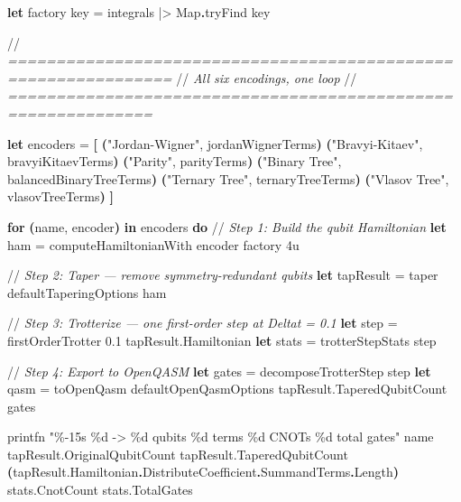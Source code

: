 \documentclass[
  11pt,
  oneside]{book}
\newenvironment{Shaded}{\begin{snugshade}}{\end{snugshade}}
\newcommand{\CommentTok}[1]{\textcolor[rgb]{0.56,0.35,0.01}{\textit{#1}}}
\newcommand{\DecValTok}[1]{\textcolor[rgb]{0.00,0.00,0.81}{#1}}
\newcommand{\FloatTok}[1]{\textcolor[rgb]{0.00,0.00,0.81}{#1}}
\newcommand{\KeywordTok}[1]{\textcolor[rgb]{0.13,0.29,0.53}{\textbf{#1}}}
\newcommand{\NormalTok}[1]{#1}
\newcommand{\OperatorTok}[1]{\textcolor[rgb]{0.81,0.36,0.00}{\textbf{#1}}}
\newcommand{\StringTok}[1]{\textcolor[rgb]{0.31,0.60,0.02}{#1}}
\begin{document}
\begin{Shaded}
\begin{Highlighting}[]
\KeywordTok{let}\NormalTok{ factory key = integrals |\textgreater{} Map}\KeywordTok{.}\NormalTok{tryFind key}

\NormalTok{//}\CommentTok{ ===============================================================}
\NormalTok{//}\CommentTok{  All six encodings, one loop}
\NormalTok{//}\CommentTok{ =============================================================}

\KeywordTok{let}\NormalTok{ encoders = }\OperatorTok{[}
    \OperatorTok{(}\StringTok{"Jordan{-}Wigner"}\NormalTok{,  jordanWignerTerms}\OperatorTok{)}
    \OperatorTok{(}\StringTok{"Bravyi{-}Kitaev"}\NormalTok{,  bravyiKitaevTerms}\OperatorTok{)}
    \OperatorTok{(}\StringTok{"Parity"}\NormalTok{,         parityTerms}\OperatorTok{)}
    \OperatorTok{(}\StringTok{"Binary Tree"}\NormalTok{,    balancedBinaryTreeTerms}\OperatorTok{)}
    \OperatorTok{(}\StringTok{"Ternary Tree"}\NormalTok{,   ternaryTreeTerms}\OperatorTok{)}
    \OperatorTok{(}\StringTok{"Vlasov Tree"}\NormalTok{,    vlasovTreeTerms}\OperatorTok{)}
\OperatorTok{]}

\KeywordTok{for} \OperatorTok{(}\NormalTok{name, encoder}\OperatorTok{)} \KeywordTok{in}\NormalTok{ encoders }\KeywordTok{do}
\NormalTok{    //}\CommentTok{ Step 1: Build the qubit Hamiltonian}
    \KeywordTok{let}\NormalTok{ ham = computeHamiltonianWith encoder factory }\DecValTok{4}\NormalTok{u}

\NormalTok{    //}\CommentTok{ Step 2: Taper --- remove symmetry{-}redundant qubits}
    \KeywordTok{let}\NormalTok{ tapResult = taper defaultTaperingOptions ham}

\NormalTok{    //}\CommentTok{ Step 3: Trotterize --- one first{-}order step at Deltat = 0.1}
    \KeywordTok{let}\NormalTok{ step = firstOrderTrotter }\FloatTok{0.1}\NormalTok{ tapResult.Hamiltonian}
    \KeywordTok{let}\NormalTok{ stats = trotterStepStats step}

\NormalTok{    //}\CommentTok{ Step 4: Export to OpenQASM}
    \KeywordTok{let}\NormalTok{ gates = decomposeTrotterStep step}
    \KeywordTok{let}\NormalTok{ qasm = toOpenQasm defaultOpenQasmOptions tapResult.TaperedQubitCount gates}

\NormalTok{    printfn }\StringTok{"\%{-}15s  \%d -> \%d qubits  \%d terms  \%d CNOTs  \%d total gates"}
\NormalTok{        name}
\NormalTok{        tapResult.OriginalQubitCount}
\NormalTok{        tapResult.TaperedQubitCount}
        \OperatorTok{(}\NormalTok{tapResult.Hamiltonian}\KeywordTok{.}\NormalTok{DistributeCoefficient}\KeywordTok{.}\NormalTok{SummandTerms}\KeywordTok{.}\NormalTok{Length}\OperatorTok{)}
\NormalTok{        stats.CnotCount}
\NormalTok{        stats.TotalGates}
\end{Highlighting}
\end{Shaded}
\end{document}
